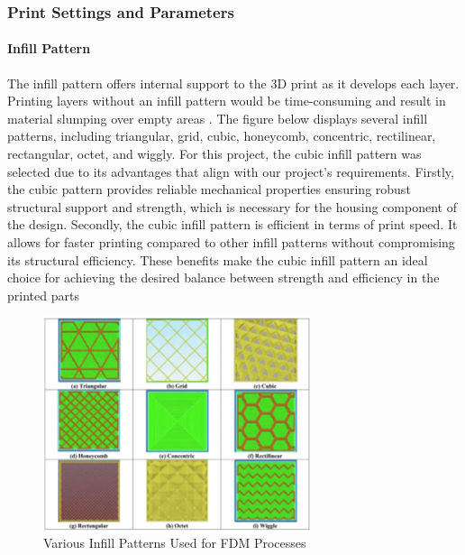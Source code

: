 \subsubsection{Print Settings and Parameters} 
\paragraph{Infill Pattern}

The infill pattern offers internal support to the 3D print as it develops each layer. 
Printing layers without an infill pattern would be time-consuming and result in material slumping over empty areas \cite{RefWorks:RefID:88-srinivasan2020impact}. 
The figure below displays several infill patterns, including triangular, grid, cubic, honeycomb, concentric, rectilinear, rectangular, octet, and wiggly. 
For this project, the cubic infill pattern was selected due to its advantages that align with our project's requirements. 
Firstly, the cubic pattern provides reliable mechanical properties ensuring robust structural support and strength, which is necessary for the housing component of the design. 
Secondly, the cubic infill pattern is efficient in terms of print speed. 
It allows for faster printing compared to other infill patterns without compromising its structural efficiency. 
These benefits make the cubic infill pattern an ideal choice for achieving the desired balance between strength and efficiency in the printed parts

\begin{figure}[htbp]
    \centering
    \includegraphics[width=0.7\textwidth]{figures/CAD-3DPrint/infillPatterns.png}
    \caption{Various Infill Patterns Used for FDM Processes}
    \label{fig:infillpatterns}
    
\end{figure}

